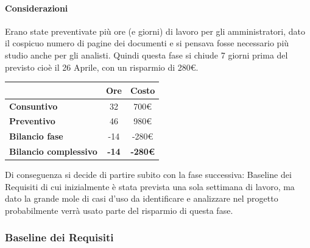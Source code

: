 \paragraph{Considerazioni} \hfill \break
Erano state preventivate più ore (e giorni) di lavoro per gli amministratori, dato il cospicuo 
numero di pagine dei documenti e si pensava fosse necessario più studio anche per gli analisti.
Quindi questa fase si chiude 7 giorni prima del previsto cioè il 26 Aprile, con un risparmio di 280\euro. 
\begin{center}
	\renewcommand{\arraystretch}{1.8} %
	\begin{tabular}{ | l |c|c| }
    \hline
    & \textbf{Ore} & \textbf{Costo} \\
	\hline
    \textbf{Consuntivo} & 32 & 700\euro \\
    \hline
    \textbf{Preventivo} & 46 & 980\euro \\
    \hline
    \textbf{Bilancio fase} & -14 & -280\euro \\
    \hline
    \textbf{Bilancio complessivo} & \textbf{-14} & \textbf{-280\euro} \\
    \hline
    \end{tabular}
\end{center}

Di conseguenza si decide di partire subito con la fase successiva: Baseline dei Requisiti di cui inizialmente 
è stata prevista una sola settimana di lavoro, ma dato la grande mole di casi d'uso da identificare e 
analizzare nel progetto probabilmente verrà usato parte del risparmio di questa fase.

\subsubsection{Baseline dei Requisiti}

